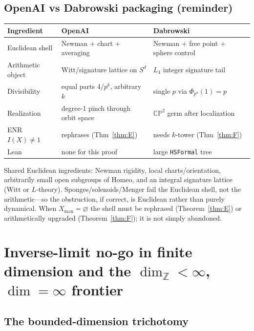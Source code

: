 \documentclass[11pt]{article}
\theoremstyle{definition}
\begin{document}
\subsection{OpenAI vs Dabrowski packaging (reminder)}
\label{sec:packaging-table}

\begin{center}
\begin{tabular}{@{}llp{5.0cm}@{}}
\toprule
Ingredient & OpenAI & Dabrowski \\
\midrule
Euclidean shell & Newman + chart + averaging & Newman + free point + sphere control \\
Arithmetic object & Witt/signature lattice on $S^d$ & $L_4$ integer signature tail \\
Divisibility & equal parts $4/p^k$, arbitrary $k$ & single $p$ via $\Phi_{p^a}(1)=p$ \\
Realization & degree-1 pinch through orbit space & $\mathbb{CP}^2$ germ after localization \\
ENR $I(X)\neq 1$ & rephrases (Thm~\ref{thm:E}) & needs $k$-tower (Thm~\ref{thm:F}) \\
Lean & none for this proof & large \texttt{HSFormal} tree \\
\bottomrule
\end{tabular}
\end{center}

Shared Euclidean ingredients: Newman rigidity, local charts/orientation,
arbitrarily small open subgroups of $\mathrm{Homeo}$, and an integral
signature lattice (Witt or $L$-theory).  Sponges/solenoids/Menger fail the
Euclidean shell, not the arithmetic---so the obstruction, if correct, is
Euclidean rather than purely dynamical.  When $X_{\mathrm{man}}=\varnothing$
the shell must be rephrased (Theorem~\ref{thm:E}) or arithmetically upgraded
(Theorem~\ref{thm:F}); it is not simply abandoned.

\section{Inverse-limit no-go in finite dimension and the $\dim_{\mathbb{Z}}<\infty$, $\dim=\infty$ frontier}
\label{sec:nogo}

\subsection{The bounded-dimension trichotomy}
\end{document}
